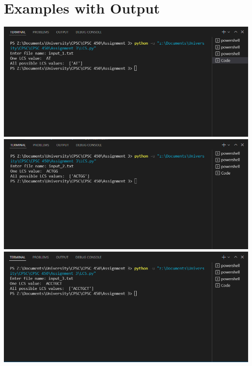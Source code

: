 \documentclass{article}
\begin{document}
\pagebreak

\section*{Examples with Output}
\includegraphics[scale=0.5]{ExampleInput1.png}\\
\includegraphics[scale=0.5]{ExampleInput2.png}\\
\includegraphics[scale=0.5]{ExampleInput3.png}\\
\end{document}
